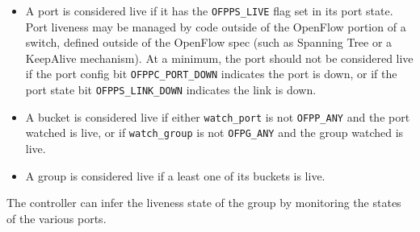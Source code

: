 \documentclass[10pt]{article}
\begin{document}
\begin{itemize}
\item A port is considered live if it has the \verb|OFPPS_LIVE| flag set in its port state.  Port liveness may be managed by code outside of the OpenFlow portion of a switch, defined outside of the OpenFlow spec (such as Spanning Tree or a KeepAlive mechanism).  At a minimum, the port should not be considered live if the port config bit \verb|OFPPC_PORT_DOWN| indicates the port is down, or if the port state bit \verb|OFPPS_LINK_DOWN| indicates the link is down.
\item A bucket is considered live if either \verb|watch_port| is not \verb|OFPP_ANY| and the port watched is live, or if \verb|watch_group| is not \verb|OFPG_ANY| and the group watched is live.
\item A group is considered live if a least one of its buckets is live.
\end{itemize}

The controller can infer the liveness state of the group by monitoring the states of the various ports.

\appendixtitleon
\begin{appendices}



\end{appendices}
 
\end{document}

